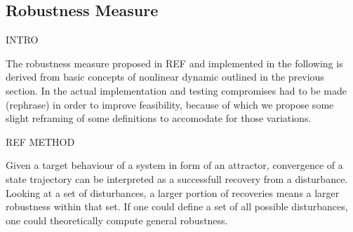 


     
     

    

    

\subsection{Robustness Measure}
    
    INTRO

    The robustness measure proposed in REF and implemented in the following is derived from basic concepts of nonlinear dynamic outlined in the previous section. In the actual implementation and testing compromises had to be made (rephrase) in order to improve feasibility, because of which we propose some slight reframing of some definitions to accomodate for those variations.
    
    REF METHOD

    Given a target behaviour of a system in form of an attractor, convergence of a state trajectory can be interpreted as a successfull recovery from a disturbance. Looking at a set of disturbances, a larger portion of recoveries means a larger robustness within that set. If one could define a set of all possible disturbances, one could theoretically compute general robustness. 


